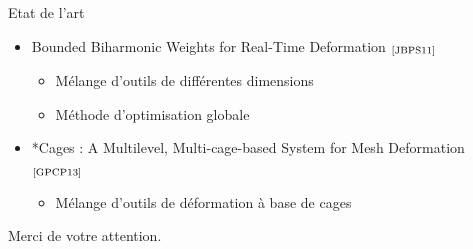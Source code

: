 \documentclass[xcolor=x11names,compress]{beamer}
\renewcommand{\(}{\begin{columns}} \renewcommand{\)}{\end{columns}}
\newcommand{\<}[1]{\begin{column}{#1}} \renewcommand{\>}{\end{column}}
\begin{document}

\begin{frame}{Etat de l'art}

\begin{itemize}
  \item Bounded Biharmonic Weights for Real-Time Deformation
  $_{\text{\cite{JBPS11}}}$
  \begin{itemize}
    \item Mélange d'outils de différentes dimensions
    \item Méthode d'optimisation globale
  \end{itemize}
  \item *Cages : A Multilevel, Multi-cage-based System for Mesh Deformation 
  $_{\text{\cite{GPCP13}}}$
  \begin{itemize}
    \item Mélange d'outils de déformation à base de cages
  \end{itemize}
\end{itemize}
  
\end{frame}

\begin{frame}{}
  
\end{frame}



\begin{frame}{}
\begin{center}
\huge Merci de votre attention.
\end{center}
\end{frame}

\appendix
\end{document}
